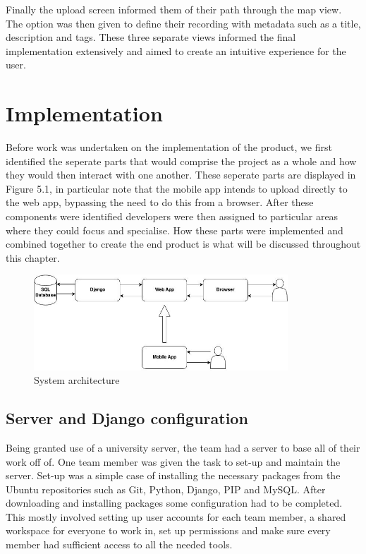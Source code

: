 \documentclass{l3proj}
\begin{document}
Finally the upload screen informed them of their path through the map view. The option was then given to define their recording with metadata such as a title, description and tags. These three separate views informed the final implementation extensively and aimed to create an intuitive experience for the user.
\chapter{Implementation}
\label{impl}

Before work was undertaken on the implementation of the product, we first identified the seperate parts that would comprise the project as a whole and how they would then interact with one another. These seperate parts are displayed in Figure 5.1, in particular note that the mobile app intends to upload directly to the web app, bypassing the need to do this from a browser. After these components were identified developers were then assigned to particular areas where they could focus and specialise. How these parts were implemented and combined together to create the end product is what will be discussed throughout this chapter.

\begin{figure}[ht!]
\centering
\includegraphics[width=0.85\textwidth]{images/project-imp.jpg}
\caption{System architecture}
\end{figure}

\section{Server and Django configuration}
Being granted use of a university server, the team had a server to base all of their work off of. One team member was given the task to set-up and maintain the server.
Set-up was a simple case of installing the necessary packages from the \gls{Ubuntu} repositories such as Git, Python, Django, \gls{PIP} and \gls{MySQL}. After downloading and installing packages some configuration had to be completed. This mostly involved setting up user accounts for each team member, a shared workspace for everyone to work in, set up permissions and make sure every member had sufficient access to all the needed tools.
\end{document}
